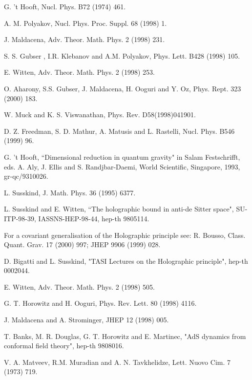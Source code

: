 \documentclass[a4paper,twocolumn,prd,groupedaddress,nofootinbib]{revtex4}
\begin{document}
  


\begin{thebibliography}{30}

 G. 't Hooft, Nucl. Phys. B72 (1974) 461.

 A. M. Polyakov, Nucl. Phys. Proc. Suppl. 68 (1998) 1.

 J. Maldacena, Adv. Theor. Math. Phys. 2 (1998) 231.

 S. S. Gubser , I.R. Klebanov and A.M. Polyakov, 
Phys. Lett. B428 (1998) 105.

 E. Witten, Adv. Theor. Math. Phys. 2 (1998) 253.

 O. Aharony, S.S. Gubser, J. Maldacena, 
H. Ooguri and Y. Oz, Phys. Rept. 323 (2000) 183.

 W. Muck and K. S. Viswanathan, Phys. Rev. D58(1998)041901.

 D. Z. Freedman, S. D. Mathur, A. Matusis and L. Rastelli,
Nucl. Phys. B546 (1999) 96.

 G. 't Hooft, ``Dimensional reduction in quantum gravity"
in Salam Festschrifft, eds. A. Aly, J. Ellis and S. Randjbar-Daemi,
 World Scientific, Singapore, 1993, gr-qc/9310026.

 L. Susskind, J. Math. Phys. 36 (1995) 6377.

 L. Susskind and E. Witten, ``The holographic bound in anti-de 
Sitter space", SU-ITP-98-39, IASSNS-HEP-98-44, hep-th 9805114.

 For a covariant generalisation of the Holographic principle see:
R. Bousso, Class. Quant. Grav. 17 (2000) 997; JHEP 9906 (1999) 028.

 D. Bigatti and L. Susskind,  "TASI Lectures on the Holographic principle",
hep-th 0002044.

 E. Witten, Adv. Theor. Math. Phys. 2 (1998) 505.

 G. T. Horowitz and H. Ooguri, Phys. Rev. Lett. 80 (1998) 4116.

 J. Maldacena and A. Strominger, JHEP 12 (1998) 005.

T. Banks, M. R. Douglas, G. T. Horowitz and E. Martinec,
"AdS dynamics from conformal field theory", hep-th 9808016.

 V. A. Matveev, R.M. Muradian and A. N. Tavkhelidze,
 Lett. Nuovo Cim. 7 (1973) 719.


\end{thebibliography}
\end{document}
